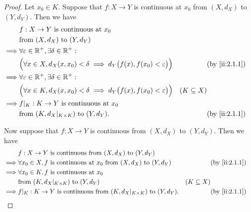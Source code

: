 \begin{proof}
  Let \(x_0 \in K\).
  Suppose that \(f : X \to Y\) is continuous at \(x_0\) from \((X, d_X)\) to \((Y, d_Y)\).
  Then we have
  \begin{align*}
             & f : X \to Y \text{ is continuous at } x_0                                                                                          \\
             & \text{from } (X, d_X) \text{ to } (Y, d_Y)                                                                                         \\
    \implies & \forall \varepsilon \in \R^+, \exists \delta \in \R^+ :                                                                            \\
             & \Big(\forall x \in X, d_X(x, x_0) < \delta \implies d_Y\big(f(x), f(x_0) < \varepsilon\big)\Big) &                 & \by{ii:2.1.1} \\
    \implies & \forall \varepsilon \in \R^+, \exists \delta \in \R^+ :                                                                            \\
             & \Big(\forall x \in K, d_X(x, x_0) < \delta \implies d_Y\big(f(x), f(x_0) < \varepsilon\big)\Big) & (K \subseteq X)                 \\
    \implies & f|_K : K \to Y \text{ is continuous at } x_0                                                                                       \\
             & \text{from } (K, d_X|_{K \times K}) \text{ to } (Y, d_Y).                                        &                 & \by{ii:2.1.1}
  \end{align*}

  Now suppose that \(f : X \to Y\) is continuous from \((X, d_X)\) to \((Y, d_Y)\).
  Then we have
  \begin{align*}
             & f : X \to Y \text{ is continuous from } (X, d_X) \text{ to } (Y, d_Y)                                                            \\
    \implies & \forall x_0 \in X, f \text{ is continuous at } x_0 \text{ from } (X, d_X) \text{ to } (Y, d_Y) &                 & \by{ii:2.1.1} \\
    \implies & \forall x_0 \in K, f \text{ is continuous at } x_0                                                                               \\
             & \text{from } (K, d_X|_{K \times K}) \text{ to } (Y, d_Y)                                       & (K \subseteq X)                 \\
    \implies & f|_K : K \to Y \text{ is continuous from } (K, d_X|_{K \times K}) \text{ to } (Y, d_Y).        &                 & \by{ii:2.1.1}
  \end{align*}
\end{proof}

